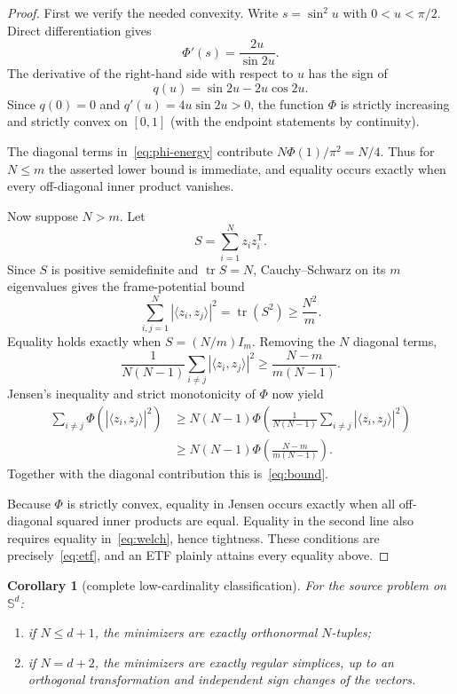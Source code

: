 \documentclass[11pt]{article}
\newtheorem{corollary}[theorem]{Corollary}
\begin{document}
\begin{proof}
First we verify the needed convexity.  Write $s=\sin^2 u$ with
$0<u<\pi/2$.  Direct differentiation gives
\[
 \Phi'(s)=\frac{2u}{\sin 2u}.
\]
The derivative of the right-hand side with respect to $u$ has the sign of
\[
 q(u)=\sin 2u-2u\cos 2u.
\]
Since $q(0)=0$ and $q'(u)=4u\sin 2u>0$, the function $\Phi$ is strictly
increasing and strictly convex on $[0,1]$ (with the endpoint statements by
continuity).

The diagonal terms in~\eqref{eq:phi-energy} contribute
$N\Phi(1)/\pi^2=N/4$.  Thus for $N\le m$ the asserted lower bound is immediate,
and equality occurs exactly when every off-diagonal inner product vanishes.

Now suppose $N>m$.  Let
\[
 S=\sum_{i=1}^N z_i z_i^{\mathsf T}.
\]
Since $S$ is positive semidefinite and $\operatorname{tr}S=N$, Cauchy--Schwarz
on its $m$ eigenvalues gives the frame-potential bound
\begin{equation}\label{eq:welch}
 \sum_{i,j=1}^N|\langle z_i,z_j\rangle|^2
 =\operatorname{tr}(S^2)\ge\frac{N^2}{m}.
\end{equation}
Equality holds exactly when $S=(N/m)I_m$.  Removing the $N$ diagonal terms,
\[
 \frac1{N(N-1)}\sum_{i\ne j}|\langle z_i,z_j\rangle|^2
 \ge \frac{N-m}{m(N-1)}.
\]
Jensen's inequality and strict monotonicity of $\Phi$ now yield
\begin{align*}
 \sum_{i\ne j}\Phi\!\left(|\langle z_i,z_j\rangle|^2\right)
 &\ge N(N-1)\Phi\!\left(
 \frac1{N(N-1)}\sum_{i\ne j}|\langle z_i,z_j\rangle|^2\right)\\
 &\ge N(N-1)\Phi\!\left(\frac{N-m}{m(N-1)}\right).
\end{align*}
Together with the diagonal contribution this is~\eqref{eq:bound}.

Because $\Phi$ is strictly convex, equality in Jensen occurs exactly when all
off-diagonal squared inner products are equal.  Equality in the second line
also requires equality in~\eqref{eq:welch}, hence tightness.  These conditions
are precisely~\eqref{eq:etf}, and an ETF plainly attains every equality above.
\end{proof}

\begin{corollary}[complete low-cardinality classification]\label{cor:small}
For the source problem on $\mathbb S^d$:
\begin{enumerate}
 \item if $N\le d+1$, the minimizers are exactly orthonormal $N$-tuples;
 \item if $N=d+2$, the minimizers are exactly regular simplices, up to an
 orthogonal transformation and independent sign changes of the vectors.
\end{enumerate}
\end{corollary}
\end{document}
